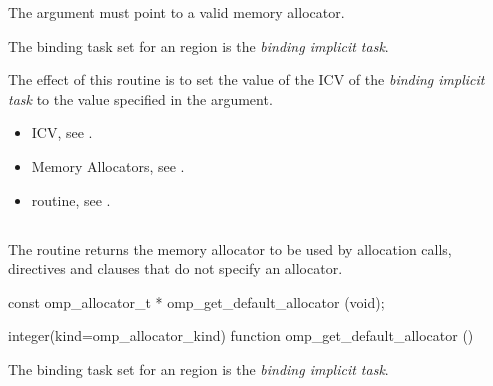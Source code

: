 \constraints

The  argument must point to a valid memory allocator.

\binding
The binding task set for an  region is the \emph{binding implicit task}.

\effect

The effect of this routine is to set the value of the  ICV of the \emph{binding implicit task} to the value specified in the  argument. 

\crossreferences

\begin{itemize}
\item {} ICV, see .
\item Memory Allocators, see .
\item {} routine, see .
\end{itemize}

\subsection{}
\label{subsec:omp_get_default_allocator}

\summary
The  routine returns the memory allocator to be used by allocation calls,  directives and  clauses that do not specify an allocator.

\format
\begin{ccppspecific}
\begin{ompcFunction}
const omp_allocator_t * omp_get_default_allocator (void);
\end{ompcFunction}
\end{ccppspecific}
\begin{fortranspecific}
\begin{ompfFunction}
integer(kind=omp_allocator_kind)
function omp_get_default_allocator ()
\end{ompfFunction}
\end{fortranspecific}

\binding

The binding task set for an  region is the \emph{binding implicit task}.

\effect

